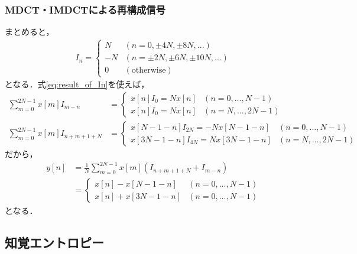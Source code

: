 \documentclass[14pt,xcolor=dvipsnames,table,dvipdfmx]{beamer}
\begin{document}
\begin{frame}[c]
    \frametitle{MDCT・IMDCTによる再構成信号}
    \scriptsize
    まとめると，
    \begin{align}
        I_{n} = \left\{ \begin{array}{ll}
            N & (n = 0, \pm 4N, \pm 8N, ...) \\
            -N & (n = \pm 2N, \pm 6N, \pm 10N, ...) \\
            0 & (\text{otherwise})
        \end{array} \right. \label{eq:result_of_In}
    \end{align}
    となる．式\eqref{eq:result_of_In}を使えば，
    \begin{align*}
        \sum_{m = 0}^{2N - 1} x[m] I_{m - n} &= \left\{ \begin{array}{ll}
            x[n] I_{0} = N x[n] & (n = 0, ..., N - 1) \\
            x[n] I_{0} = N x[n] & (n = N, ..., 2N - 1)
        \end{array} \right. \\
        \sum_{m = 0}^{2N - 1} x[m] I_{n + m + 1 + N} &= \left\{ \begin{array}{ll}
            x[N - 1 - n] I_{2N} = -N x[N - 1 - n] & (n = 0, ..., N - 1) \\
            x[3N - 1 - n] I_{4N} = N x[3N - 1 - n] & (n = N, ..., 2N - 1)
        \end{array} \right.
    \end{align*}
    だから，
    \begin{align*}
        y[n] &= \frac{1}{N} \sum_{m = 0}^{2N - 1} x[m] ( I_{n + m + 1 + N} + I_{m - n} ) \\
        &= \left\{ \begin{array}{ll}
            x[n] - x[N - 1 - n] & (n = 0, ..., N - 1) \\
            x[n] + x[3N - 1 - n] & (n = 0, ..., N - 1)
        \end{array} \right.
    \end{align*}
    となる．
\end{frame}

\subsection{知覚エントロピー} \label{sec:proofs_perceptual_entropy}
\end{document}
